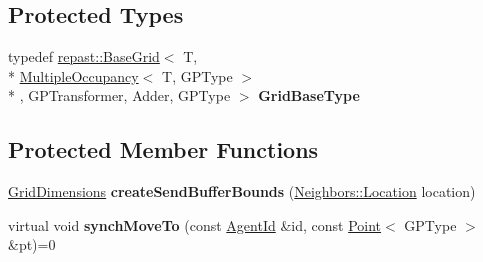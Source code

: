 \subsection*{Protected Types}
\begin{DoxyCompactItemize}
\item 
\hypertarget{classrepast_1_1_shared_base_grid_afdd62d17e80eb799ba63451b8f78f0ee}{typedef \hyperlink{classrepast_1_1_base_grid}{repast\-::\-Base\-Grid}$<$ T, \\*
\hyperlink{classrepast_1_1_multiple_occupancy}{Multiple\-Occupancy}$<$ T, G\-P\-Type $>$\\*
, G\-P\-Transformer, Adder, G\-P\-Type $>$ {\bfseries Grid\-Base\-Type}}\label{classrepast_1_1_shared_base_grid_afdd62d17e80eb799ba63451b8f78f0ee}

\end{DoxyCompactItemize}
\subsection*{Protected Member Functions}
\begin{DoxyCompactItemize}
\item 
\hypertarget{classrepast_1_1_shared_base_grid_a84acccc25e0e3e21f8d430a36c9d395a}{\hyperlink{classrepast_1_1_grid_dimensions}{Grid\-Dimensions} {\bfseries create\-Send\-Buffer\-Bounds} (\hyperlink{classrepast_1_1_neighbors_a7a695a73b614b849f12fd943329b8bdc}{Neighbors\-::\-Location} location)}\label{classrepast_1_1_shared_base_grid_a84acccc25e0e3e21f8d430a36c9d395a}

\item 
\hypertarget{classrepast_1_1_shared_base_grid_a51922e0249368abd598ead8101088732}{virtual void {\bfseries synch\-Move\-To} (const \hyperlink{classrepast_1_1_agent_id}{Agent\-Id} \&id, const \hyperlink{classrepast_1_1_point}{Point}$<$ G\-P\-Type $>$ \&pt)=0}\label{classrepast_1_1_shared_base_grid_a51922e0249368abd598ead8101088732}

\end{DoxyCompactItemize}

